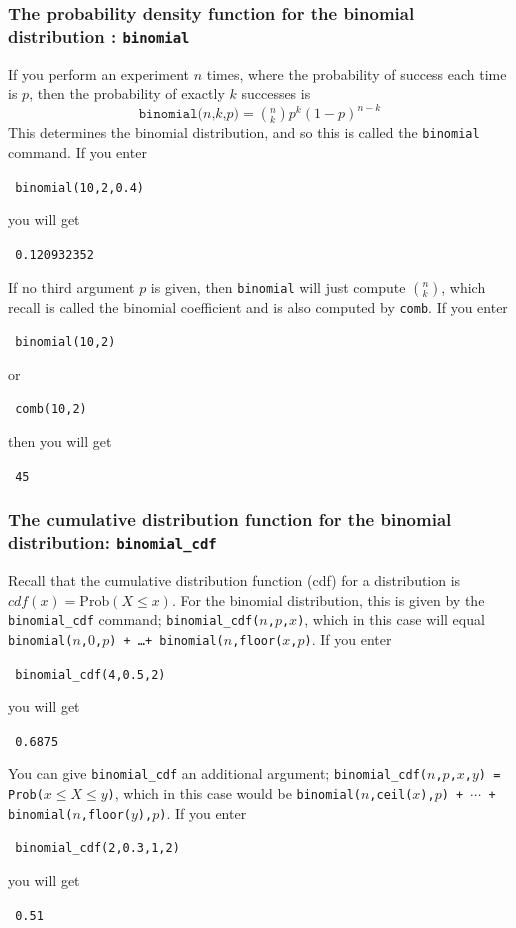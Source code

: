 \documentclass[a4paper,11pt]{book}
\begin{document}
\subsubsection{The probability density function for the binomial
distribution : \texttt{binomial}}

If you perform an experiment $n$ times, where the probability of
success each time is $p$, then the probability of exactly $k$
successes is 
\[ \texttt{binomial($n$,$k$,$p$)} = \left(^n_k\right) p^k (1-p)^{n-k}\]
This determines the binomial distribution, and so this is called the 
\texttt{binomial} command.  If you enter
\begin{center}
  \tt
  binomial(10,2,0.4)
\end{center}
you will get
\begin{center}
  \tt
  0.120932352
\end{center}
If no third argument $p$ is given, then \texttt{binomial} will just
compute $\left(^n_k\right)$, which recall is called the binomial
coefficient and is also computed by \texttt{comb}.  If you enter
\begin{center}
  \tt
  binomial(10,2)
\end{center}
or
\begin{center}
  \tt
  comb(10,2)
\end{center}
then you will get
\begin{center}
  \tt
   45
\end{center}

\subsubsection{The cumulative distribution function for the binomial
distribution: \texttt{binomial\_cdf}}

Recall that the cumulative distribution function (cdf) for a
distribution is $cdf(x) = \text{Prob}(X \le x)$.  For the binomial
distribution, this is given by the \texttt{binomial\_cdf} command; 
\texttt{binomial\_cdf($n$,$p$,$x$)}, which in this case will equal
\texttt{binomial($n$,$0$,$p$) + \ldots + binomial($n$,floor($x$,$p$)}.
If you enter
\begin{center}
  \tt
  binomial\_cdf(4,0.5,2)
\end{center}
you will get
\begin{center}
  \tt
  0.6875
\end{center}
You can give \texttt{binomial\_cdf} an additional argument;
\texttt{binomial\_cdf($n$,$p$,$x$,$y$) = Prob($x \le X \le y$)}, which
in this case would be
\texttt{binomial($n$,ceil($x$),$p$) + $\cdots$ + binomial($n$,floor($y$),$p$)}.
If you enter
\begin{center}
  \tt
  binomial\_cdf(2,0.3,1,2)
\end{center}
you will get
\begin{center}
  \tt
  0.51
\end{center}
\end{document}
